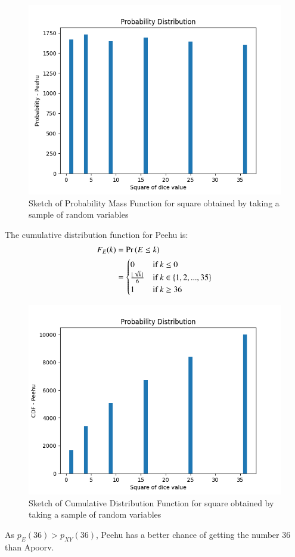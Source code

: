 \documentclass[journal,12pt,twocolumn]{IEEEtran}
\theoremstyle{remark}
\begin{document}
\begin{enumerate}
\begin{figure}[h!]
    \includegraphics[width=\columnwidth]{plots/PDF - Peehu.png}
    \caption{Sketch of Probability Mass Function for square obtained by taking a sample of random variables}
\end{figure}
The cumulative distribution function for Peehu is:
\begin{align}
    F_E(k) &= \Pr\left(E \leq k\right)\\
    &= 
    \begin{cases}
        0 & \text{if }k \leq 0\\
        \frac{\lfloor\sqrt{k}\rfloor}{6} & \text{if }k \in \{1, 2, ..., 35\}\\
        1 & \text{if }k \geq 36
    \end{cases}
\end{align}
\begin{figure}[h!]
    \includegraphics[width=\columnwidth]{plots/CDF - Peehu.png}
    \caption{Sketch of Cumulative Distribution Function for square obtained by taking a sample of random variables}
\end{figure}
\end{enumerate}
As $p_{E}(36) > p_{XY}(36)$, Peehu has a better chance of getting the number 36 than Apoorv.
\end{document}
